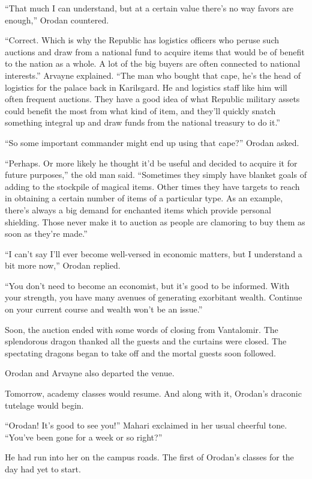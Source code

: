 \documentclass[a4paper,10pt]{book}
\begin{document}
“That much I can understand, but at a certain value there’s no way favors are enough,” Orodan countered.\par
“Correct. Which is why the Republic has logistics officers who peruse such auctions and draw from a national fund to acquire items that would be of benefit to the nation as a whole. A lot of the big buyers are often connected to national interests.” Arvayne explained. “The man who bought that cape, he’s the head of logistics for the palace back in Karilsgard. He and logistics staff like him will often frequent auctions. They have a good idea of what Republic military assets could benefit the most from what kind of item, and they’ll quickly snatch something integral up and draw funds from the national treasury to do it.”\par
“So some important commander might end up using that cape?” Orodan asked.\par
“Perhaps. Or more likely he thought it’d be useful and decided to acquire it for future purposes,” the old man said. “Sometimes they simply have blanket goals of adding to the stockpile of magical items. Other times they have targets to reach in obtaining a certain number of items of a particular type. As an example, there’s always a big demand for enchanted items which provide personal shielding. Those never make it to auction as people are clamoring to buy them as soon as they’re made.”\par
“I can’t say I’ll ever become well-versed in economic matters, but I understand a bit more now,” Orodan replied.\par
“You don’t need to become an economist, but it’s good to be informed. With your strength, you have many avenues of generating exorbitant wealth. Continue on your current course and wealth won’t be an issue.”\par
Soon, the auction ended with some words of closing from Vantalomir. The splendorous dragon thanked all the guests and the curtains were closed. The spectating dragons began to take off and the mortal guests soon followed.\par
Orodan and Arvayne also departed the venue.\par
Tomorrow, academy classes would resume. And along with it, Orodan’s draconic tutelage would begin.\par
\par
“Orodan! It’s good to see you!” Mahari exclaimed in her usual cheerful tone. “You’ve been gone for a week or so right?”\par
He had run into her on the campus roads. The first of Orodan’s classes for the day had yet to start.\par
\end{document}
